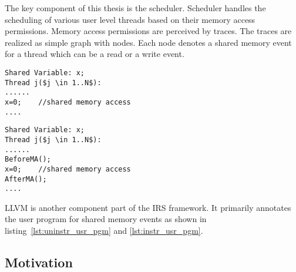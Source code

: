 The key component of this thesis is the scheduler. 
Scheduler handles the scheduling of various user level threads based on their memory access permissions. 
Memory access permissions are perceived by traces. 
The traces are realized as simple graph with nodes. 
Each node denotes a shared memory event for a thread which can be a read or a write event. 
\\
\noindent\begin{minipage}{.45\textwidth}
\begin{lstlisting}[mathescape=true,style=customc,caption={Uninstrumented User Program},frame=tlrb,label={lst:uninstr_usr_pgm}]
Shared Variable: x;
Thread j($j \in 1..N$): 
......
x=0;	//shared memory access
....
\end{lstlisting}
\end{minipage}\hfill
\begin{minipage}{.45\textwidth}
\begin{lstlisting}[mathescape=true,style=customc,caption={Instrumented User Program},frame=tlrb,label={lst:instr_usr_pgm}]
Shared Variable: x;
Thread j($j \in 1..N$): 
......
BeforeMA();
x=0;	//shared memory access
AfterMA();
....
\end{lstlisting}
\end{minipage}

LLVM is another component part of the IRS framework. 
It primarily annotates the user program for shared memory events as shown in listing~\ref{lst:uninstr_usr_pgm} and \ref{lst:instr_usr_pgm}. 

\subsection{Motivation \label{mot}}


